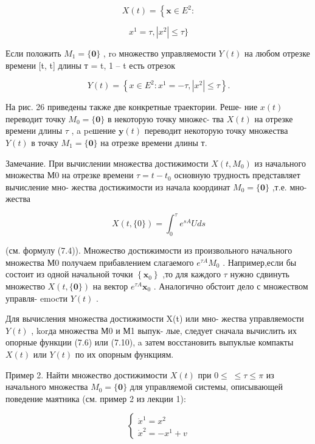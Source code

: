 \documentclass[8pt]{extarticle}
\begin{document}
\[
X\left( t\right)  = \left\{  {\mathbf{x} \in  {E}^{2} : }\right.
\]

\[
{x}^{1} = \tau ,\left| {x}^{2}\right|  \leq  \tau \}
\]

Если положить \({M}_{1} = \{ \mathbf{0}\}\) , ro множество управляемости \(Y\left( t\right)\) на любом отрезке времени [t, t] длины т = t, 1 – t есть отрезок

\[
Y\left( t\right)  = \left\{  {x \in  {E}^{2} : {x}^{1} =  - \tau ,\left| {x}^{2}\right|  \leq  \tau }\right\}  .
\]

На рис. 26 приведены также две конкретные траектории. Реше- ние \(x\left( t\right)\) переводит точку \({M}_{0} = \{ \mathbf{0}\}\) в некоторую точку множес- тва \(X\left( t\right)\) на отрезке времени длины \(\tau\) , a peшение \(\mathbf{y}\left( t\right)\) переводит некоторую точку множества \(Y\left( t\right)\) в точку \({M}_{1} = \{ \mathbf{0}\}\) на отрезке времени длины т.

Замечание. При вычислении множества достижимости \(X\left( {t,{M}_{0}}\right)\) из начального множества М0 на отрезке времени \(\tau  = t - {t}_{0}\) основную трудность представляет вычисление мно- жества достижимости из начала координат \({M}_{0} = \{ \mathbf{0}\}\) ,т.е. мно- жества

\[
X\left( {t,\{ 0\} }\right)  = {\int }_{0}^{\tau }{e}^{sA}{Uds} \tag{7.11}
\]

(см. формулу (7.4)). Множество достижимости из произвольного начального множества М0 получаем прибавлением слагаемого \({e}^{\tau A}{M}_{0}\) . Например,если бы состоит из одной начальной точки \(\left\{  {\mathbf{x}}_{0}\right\}\) ,то для каждого \(\tau\) нужно сдвинуть множество \(X\left( {t,\{ \mathbf{0}\} }\right)\) на вектор \({e}^{\tau A}{\mathbf{x}}_{0}\) . Аналогично обстоит дело с множеством управля- emocти \(Y\left( t\right)\) .

Для вычисления множества достижимости X(t) или мно- жества управляемости \(Y\left( t\right)\) , korда множества М0 и М1 выпук- лые, следует сначала вычислить их опорные функции (7.6) или (7.10), a затем восстановить выпуклые компакты \(X\left( t\right)\) или \(Y\left( t\right)\) по их опорным функциям.

Пример 2. Найти множество достижимости \(X\left( t\right)\) при \(0 \leq \; \leq  \tau  \leq  \pi\) из начального множества \({M}_{0} = \{ \mathbf{0}\}\) для управляемой системы, описывающей поведение маятника (см. пример 2 из лекции 1):

\[
\left\{  \begin{array}{l} {\dot{x}}^{1} = {x}^{2} \\  {\dot{x}}^{2} =  - {x}^{1} + v \end{array}\right.
\]
\end{document}
